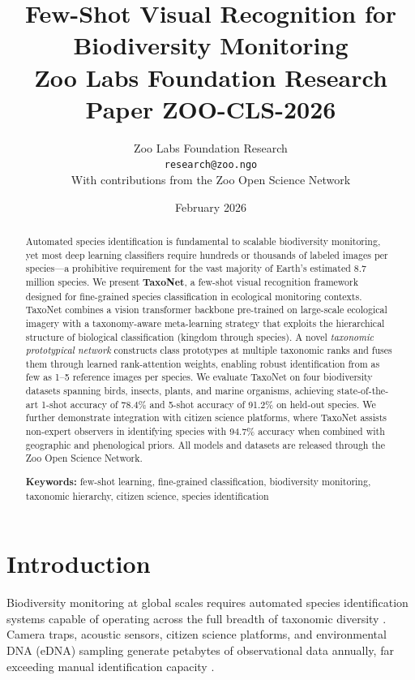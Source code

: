 \documentclass[11pt,a4paper]{article}
\title{%
  \textbf{Few-Shot Visual Recognition for\\Biodiversity Monitoring}\\[0.5em]
  \large Zoo Labs Foundation Research Paper ZOO-CLS-2026
}
\author{
  Zoo Labs Foundation Research\\
  \texttt{research@zoo.ngo}\\[0.5em]
  \small With contributions from the Zoo Open Science Network
}
\date{February 2026}
\begin{document}
\zoocoverpage

\begin{abstract}
\noindent
Automated species identification is fundamental to scalable biodiversity
monitoring, yet most deep learning classifiers require hundreds or
thousands of labeled images per species---a prohibitive requirement for
the vast majority of Earth's estimated 8.7 million species. We present
\textbf{TaxoNet}, a few-shot visual recognition framework designed for
fine-grained species classification in ecological monitoring contexts.
TaxoNet combines a vision transformer backbone pre-trained on large-scale
ecological imagery with a taxonomy-aware meta-learning strategy that
exploits the hierarchical structure of biological classification (kingdom
through species). A novel \emph{taxonomic prototypical network}
constructs class prototypes at multiple taxonomic ranks and fuses them
through learned rank-attention weights, enabling robust identification
from as few as 1--5 reference images per species. We evaluate TaxoNet on
four biodiversity datasets spanning birds, insects, plants, and marine
organisms, achieving state-of-the-art 1-shot accuracy of 78.4\% and
5-shot accuracy of 91.2\% on held-out species. We further demonstrate
integration with citizen science platforms, where TaxoNet assists
non-expert observers in identifying species with 94.7\% accuracy when
combined with geographic and phenological priors. All models and datasets
are released through the Zoo Open Science Network.

\medskip
\noindent\textbf{Keywords:} few-shot learning, fine-grained
classification, biodiversity monitoring, taxonomic hierarchy, citizen
science, species identification
\end{abstract}

\newpage
\tableofcontents
\newpage

\section{Introduction}
\label{sec:introduction}

Biodiversity monitoring at global scales requires automated species
identification systems capable of operating across the full breadth of
taxonomic diversity \citep{christin2019applications}. Camera traps,
acoustic sensors, citizen science platforms, and environmental DNA (eDNA)
sampling generate petabytes of observational data annually, far exceeding
manual identification capacity \citep{steenweg2017scaling}.
\end{document}
